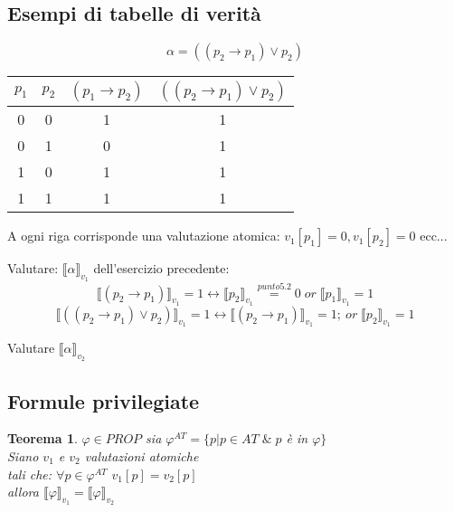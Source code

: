 \documentclass{article}
\newtheorem{theorem}{Teorema}
\theoremstyle{break}
\theoremstyle{break}
\theoremstyle{break}
\theoremstyle{break}
\begin{document}
\subsection{Esempi di tabelle di verità}
\begin{example}
  \[
    \alpha = ((p_2 \to  p_1)\vee p_2)
  \]
  \begin{center}
    \begin{tabular}{c|c|c|c}
      \( p_1 \) & \( p_2 \) & \( (p_1 \to p_2) \) & \( ((p_2 \to  p_1)\vee p_2) \) \\
      \hline
      0         & 0         & 1                   & 1                              \\
      0         & 1         & 0                   & 1                              \\
      1         & 0         & 1                   & 1                              \\
      1         & 1         & 1                   & 1                              \\
    \end{tabular}
  \end{center}
  A ogni riga corrisponde una valutazione atomica: \( v_1[p_1] = 0, v_1[p_2] = 0 \) ecc...
\end{example}

\begin{exercise}
  Valutare: \( \llbracket \alpha\rrbracket_{v_1} \) dell'esercizio precedente:
  \[ \llbracket (p_2 \to p_1)\rrbracket_{v_1}=1 \leftrightarrow \llbracket p_2\rrbracket_{v_1}\stackrel{punto 5.2}{=} 0\; or\; \llbracket p_1\rrbracket_{v_1}=1 \]
  \[ \llbracket ((p_2 \to p_1)\vee p_2)\rrbracket_{v_1} = 1 \leftrightarrow \llbracket (p_2 \to p_1)\rrbracket_{v_1}=1;\ or\; \llbracket p_2\rrbracket_{v_1}=1 \]
\end{exercise}

\begin{exercise}[A casa]
  Valutare \( \llbracket \alpha\rrbracket_{v_2} \)
\end{exercise}


\subsection{Formule privilegiate}
\begin{theorem}
  \( \varphi \in PROP \) sia \( \varphi^{AT} = \{ p | p \in AT\; \&\; p \) è in \( \varphi\} \) \\
  Siano \( v_1 \) e \( v_2 \) valutazioni atomiche\\
  tali che: \( \forall p \in \varphi^{AT} \) \( v_1[p]=v_2[p] \) \\
  allora \( \llbracket \varphi\rrbracket_{v_1} = \llbracket \varphi\rrbracket_{v_2} \)
\end{theorem}
\end{document}
